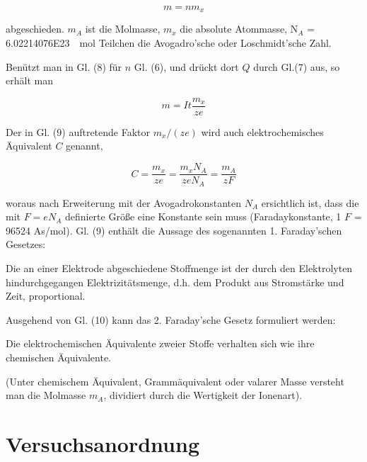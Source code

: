 \documentclass[11pt,ngerman]{scrartcl}
\begin{document}
\begin{equation}
	m = n m_x
\end{equation}

abgeschieden. $m_A$ ist die Molmasse, $m_x$ die absolute Atommasse, N$_A$ = \SI{6.02214076E23}{\per\mol} \cite{SIstandard2019} Teilchen die
Avogadro'sche oder Loschmidt'sche Zahl.

Benützt man in Gl. (8) für $n$ Gl. (6), und drückt dort $Q$ durch Gl.(7) aus, so erhält man

\begin{equation}
	m = I t \frac{m_x}{z e}
\end{equation}

Der in Gl. (9) auftretende Faktor $m_x / (ze)$ wird auch elektrochemisches Äquivalent $C$ genannt,

\begin{equation}
	C = \frac{m_x}{z e} = \frac{m_x N_A}{z e N_A} = \frac{m_A}{z F}
	\label{eq:elektrochem}
\end{equation}

woraus nach Erweiterung mit der Avogadrokonstanten $N_A$ ersichtlich ist, dass die mit $F = e N_A$
definierte Größe eine Konstante sein muss (Faradaykonstante, 1 $F$ = 96524 As/mol).
Gl. (9) enthält die Aussage des sogenannten 1. Faraday'schen Gesetzes:

\vspace{2mm}

Die an einer Elektrode abgeschiedene Stoffmenge ist der durch den Elektrolyten hindurchgegangen
Elektrizitätsmenge, d.h. dem Produkt aus Stromstärke und Zeit, proportional.

\vspace{2mm}

Ausgehend von Gl. (10) kann das 2. Faraday'sche Gesetz formuliert werden:

\vspace{2mm}

Die elektrochemischen Äquivalente zweier Stoffe verhalten sich wie ihre chemischen Äquivalente.

\vspace{2mm}

(Unter chemischem Äquivalent, Grammäquivalent oder valarer Masse versteht man die Molmasse
$m_A$, dividiert durch die Wertigkeit der Ionenart).\cite{vorlagesilber}


\newpage

\section{Versuchsanordnung}\label{sec:Versuchsanordnung}
\end{document}
